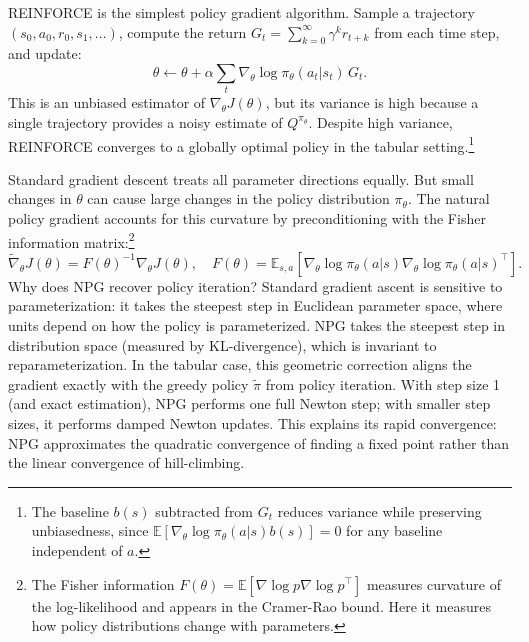 REINFORCE \citep{williams1992} is the simplest policy gradient algorithm. Sample a trajectory $(s_0, a_0, r_0, s_1, \ldots)$, compute the return $G_t = \sum_{k=0}^\infty \gamma^k r_{t+k}$ from each time step, and update:
\begin{equation}
\theta \leftarrow \theta + \alpha \sum_t \nabla_\theta \log \pi_\theta(a_t|s_t) \, G_t.
\end{equation}
This is an unbiased estimator of $\nabla_\theta J(\theta)$, but its variance is high because a single trajectory provides a noisy estimate of $Q^{\pi_\theta}$. Despite high variance, REINFORCE converges to a globally optimal policy in the tabular setting.\footnote{The baseline $b(s)$ subtracted from $G_t$ reduces variance while preserving unbiasedness, since $\mathbb{E}[\nabla_\theta \log \pi_\theta(a|s) b(s)] = 0$ for any baseline independent of $a$.}

Standard gradient descent treats all parameter directions equally. But small changes in $\theta$ can cause large changes in the policy distribution $\pi_\theta$. The natural policy gradient \citep{Kakade2001} accounts for this curvature by preconditioning with the Fisher information matrix:\footnote{The Fisher information $F(\theta) = \mathbb{E}[\nabla \log p \nabla \log p^\top]$ measures curvature of the log-likelihood and appears in the Cramer-Rao bound. Here it measures how policy distributions change with parameters.}
\begin{equation}
\tilde{\nabla}_\theta J(\theta) = F(\theta)^{-1} \nabla_\theta J(\theta), \quad F(\theta) = \mathbb{E}_{s,a} \left[ \nabla_\theta \log \pi_\theta(a|s) \nabla_\theta \log \pi_\theta(a|s)^\top \right].
\end{equation}
Why does NPG recover policy iteration? Standard gradient ascent is sensitive to parameterization: it takes the steepest step in Euclidean parameter space, where units depend on how the policy is parameterized. NPG takes the steepest step in distribution space (measured by KL-divergence), which is invariant to reparameterization. In the tabular case, this geometric correction aligns the gradient exactly with the greedy policy $\tilde{\pi}$ from policy iteration. With step size 1 (and exact estimation), NPG performs one full Newton step; with smaller step sizes, it performs damped Newton updates. This explains its rapid convergence: NPG approximates the quadratic convergence of finding a fixed point rather than the linear convergence of hill-climbing.

